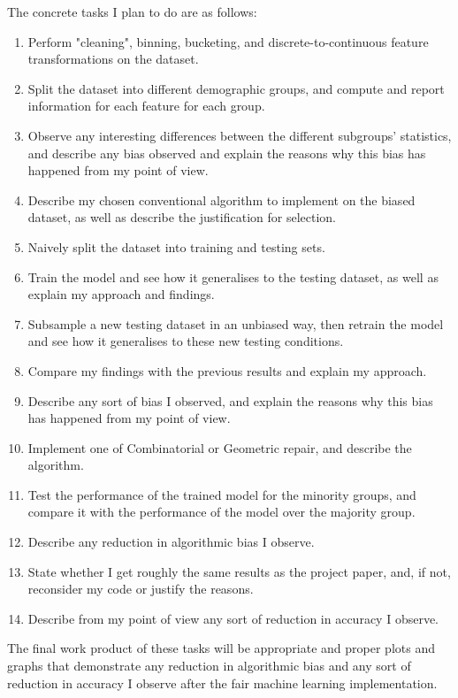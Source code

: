 \documentclass[conference]{IEEEtran}
\begin{document}
The concrete tasks I plan to do are as follows:
\begin{enumerate}
    \item Perform "cleaning", binning, bucketing, and discrete-to-continuous feature transformations on the dataset.
    \item Split the dataset into different demographic groups, and compute and report information for each feature for each group.
    \item Observe any interesting differences between the different
    subgroups’ statistics, and describe any bias observed and explain the reasons why this bias has happened from my point of view.
    \item Describe my chosen conventional algorithm to implement on the biased dataset, as well as describe the justification for selection.
    \item Naively split the dataset into training and testing sets.
    \item Train the model and see how it generalises to the testing dataset, as well as explain my approach and findings.
    \item Subsample a new testing dataset in an unbiased way, then retrain the model and see how it generalises to these new testing conditions. 
    \item Compare my findings with the previous results and explain my approach.
    \item Describe any sort of bias I observed, and explain the reasons why this bias has happened from my point of view.
    \item Implement one of Combinatorial or Geometric repair, and describe the algorithm.
    \item Test the performance of the trained model for the minority groups, and compare it with the performance of the model over the majority group.
    \item Describe any reduction in algorithmic bias I observe.
    \item State whether I get roughly the same results as the project paper, and, if not, reconsider my code or justify the reasons.
    \item Describe from my point of view any sort of reduction in accuracy I observe.
\end{enumerate}

The final work product of these tasks will be appropriate and proper plots and graphs that demonstrate any reduction in algorithmic bias and any sort of reduction in accuracy I observe after the fair machine learning implementation.
\end{document}
